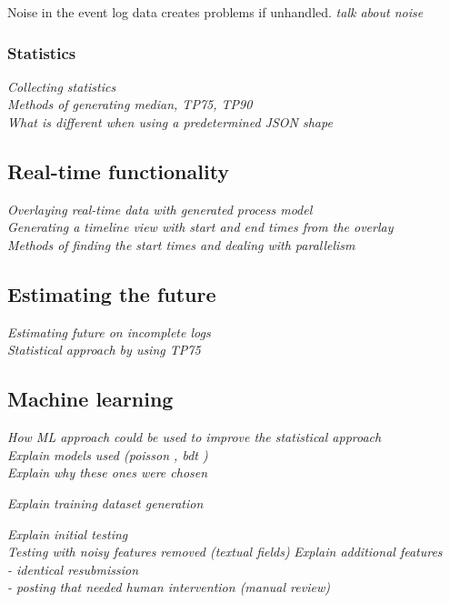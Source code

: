 \documentclass[english,12pt,a4paper,pdftex,sci,utf8]{aaltothesis}
\theoremstyle{definition}
\newcommand{\nyi}[1]{\noindent\colorbox{nyibg}{\textcolor{nyitext}{\emph{#1}}}}
\begin{document}
Noise in the event log data creates problems if unhandled. 
\nyi{talk about noise}

\subsubsection{Statistics}

\nyi{Collecting statistics}\\
\nyi{Methods of generating median, TP75, TP90}\\
\nyi{What is different when using a predetermined JSON shape}

\subsection{Real-time functionality}

\nyi{Overlaying real-time data with generated process model}\\
\nyi{Generating a timeline view with start and end times from the overlay}\\
\nyi{Methods of finding the start times and dealing with parallelism}

\subsection{Estimating the future}

\nyi{Estimating future on incomplete logs}\\
\nyi{Statistical approach by using TP75}

\subsection{Machine learning}

\nyi{How ML approach could be used to improve the statistical approach}\\
\nyi{Explain models used (poisson \cite{azurepoisson}, bdt \cite{azurebdt} \cite{lambdamart2010})}\\
\nyi{Explain why these ones were chosen}

\nyi{Explain training dataset generation}

\nyi{Explain initial testing}\\
\nyi{Testing with noisy features removed (textual fields)}
\nyi{Explain additional features}\\
\nyi{ - identical resubmission}\\
\nyi{ - posting that needed human intervention (manual review)}
\end{document}
